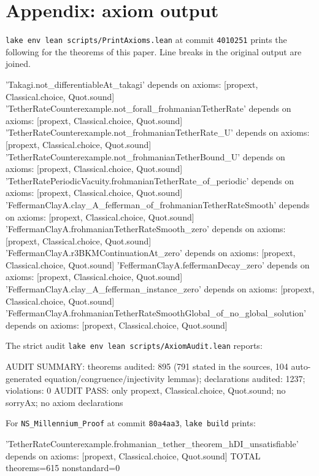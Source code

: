 \documentclass[11pt,a4paper]{article}
\theoremstyle{definition}
\theoremstyle{remark}
\newcommand{\lean}[1]{\texttt{#1}}
\begin{document}
\section*{Appendix: axiom output}
\lean{lake env lean scripts/PrintAxioms.lean} at commit \lean{4010251} prints the following for the theorems of this paper. Line breaks in the original output are joined.
\begin{leancode}
'Takagi.not_differentiableAt_takagi' depends on axioms:
    [propext, Classical.choice, Quot.sound]
'TetherRateCounterexample.not_forall_frohmanianTetherRate' depends on axioms:
    [propext, Classical.choice, Quot.sound]
'TetherRateCounterexample.not_frohmanianTetherRate_U' depends on axioms:
    [propext, Classical.choice, Quot.sound]
'TetherRateCounterexample.not_frohmanianTetherBound_U' depends on axioms:
    [propext, Classical.choice, Quot.sound]
'TetherRatePeriodicVacuity.frohmanianTetherRate_of_periodic' depends on axioms:
    [propext, Classical.choice, Quot.sound]
'FeffermanClayA.clay_A_fefferman_of_frohmanianTetherRateSmooth' depends on axioms:
    [propext, Classical.choice, Quot.sound]
'FeffermanClayA.frohmanianTetherRateSmooth_zero' depends on axioms:
    [propext, Classical.choice, Quot.sound]
'FeffermanClayA.r3BKMContinuationAt_zero' depends on axioms:
    [propext, Classical.choice, Quot.sound]
'FeffermanClayA.feffermanDecay_zero' depends on axioms:
    [propext, Classical.choice, Quot.sound]
'FeffermanClayA.clay_A_fefferman_instance_zero' depends on axioms:
    [propext, Classical.choice, Quot.sound]
'FeffermanClayA.frohmanianTetherRateSmoothGlobal_of_no_global_solution'
    depends on axioms: [propext, Classical.choice, Quot.sound]
\end{leancode}
\noindent The strict audit \lean{lake env lean scripts/AxiomAudit.lean} reports:
\begin{leancode}
AUDIT SUMMARY: theorems audited: 895 (791 stated in the sources, 104
  auto-generated equation/congruence/injectivity lemmas); declarations
  audited: 1237; violations: 0
AUDIT PASS: only propext, Classical.choice, Quot.sound; no sorryAx;
  no axiom declarations
\end{leancode}
\noindent For \lean{NS\_Millennium\_Proof} at commit \lean{80a4aa3}, \lean{lake build} prints:
\begin{leancode}
'TetherRateCounterexample.frohmanian_tether_theorem_hDI_unsatisfiable'
    depends on axioms: [propext, Classical.choice, Quot.sound]
TOTAL theorems=615 nonstandard=0
\end{leancode}
\end{document}
